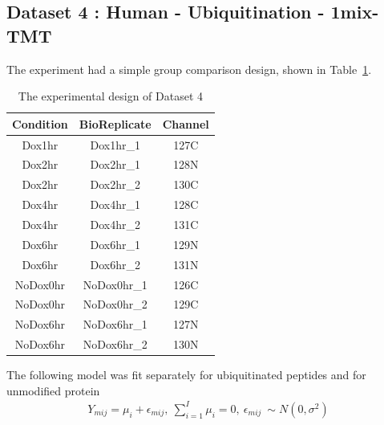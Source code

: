 \documentclass{mcp}
\begin{document}
\clearpage
\subsection{Dataset 4 : Human - Ubiquitination - 1mix-TMT}
\label{sec:ipah}

The experiment had a simple group comparison design, shown in Table~\ref{table:ipah_design}.

\begin{table}[h!]
\centering
\begin{tabular}{| c | c | c |}
\hline
 Condition & BioReplicate & Channel \\ [0.5ex]
 \hline\hline
 Dox1hr & Dox1hr\_1 & 127C\\
 \hline
 Dox2hr & Dox2hr\_1 & 128N\\
\hline
 Dox2hr & Dox2hr\_2 & 130C\\
\hline
 Dox4hr & Dox4hr\_1 & 128C\\
\hline
 Dox4hr & Dox4hr\_2 & 131C\\
\hline
 Dox6hr & Dox6hr\_1 & 129N\\
\hline
 Dox6hr & Dox6hr\_2 & 131N\\
\hline
 NoDox0hr & NoDox0hr\_1 & 126C\\
\hline
 NoDox0hr & NoDox0hr\_2 & 129C\\
\hline
 NoDox6hr & NoDox6hr\_1 & 127N\\
\hline
 NoDox6hr & NoDox6hr\_2 & 130N\\
\hline
\end{tabular}
\caption{The experimental design of Dataset 4}
\label{table:ipah_design}
\end{table}
The following model was fit separately for ubiquitinated peptides and for unmodified protein 
\begin{eqnarray*}
& Y_{mij} = \mu_i + \epsilon_{mij},\ \sum_{i=1}^I{\mu_i} = 0 ,\ \epsilon_{mij} ~ \sim N(0, \sigma^2) &
\end{eqnarray*}
\end{document}
